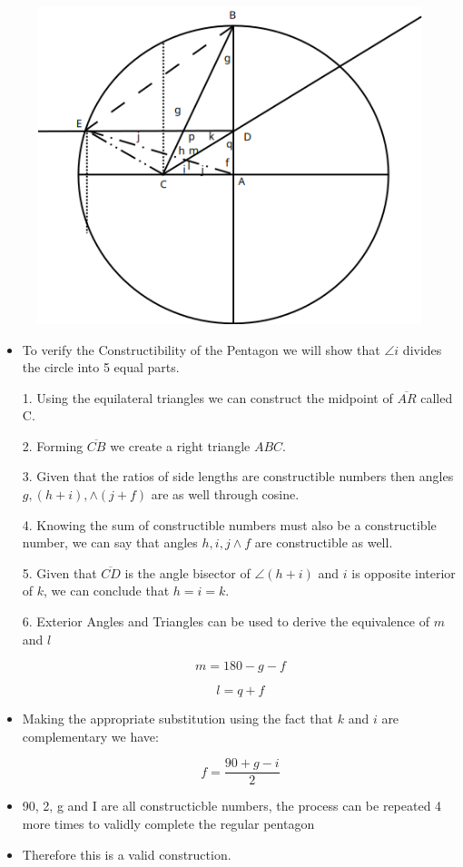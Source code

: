 \documentclass[]{report}
\begin{document}
\begin{figure}[H]
	\centering
	\includegraphics[width=0.7\linewidth]{pics/p3}
\end{figure}

\begin{itemize}
\item To verify the Constructibility of the Pentagon we will show that $\angle{i}$  divides the circle into 5 equal parts.

\item[1.]  Using the equilateral triangles we can construct the midpoint of $\overline{AR}$  called C.

\item[2.]  Forming $\overline{CB}$ we create a right triangle $ABC$.  

\item[3.] Given that the ratios of side lengths are constructible numbers then  angles $g, (h + i),  \land  (j + f)$ are as well through cosine.

\item[4.] Knowing the sum of constructible numbers must also be a constructible number, we can say that angles $ h, i, j \land f$ are constructible as well.

\item[5.] Given that $\overline{CD}$ is the angle bisector of $\angle (h + i)$ and $i$ is opposite interior of $k$,  we can conclude that $h = i = k$.

\item[6.] Exterior Angles and Triangles can be used to derive the equivalence of $m$ and $l$ 

$$ m = 180 - g - f $$

$$ l = q + f $$ 

\item Making the appropriate substitution using the fact that $k$ and $i$ are complementary we have:

$$ f = \frac{90 + g - i}{2}  $$


\item 90, 2, g and I are all constructicble numbers, the process can be repeated 4 more times to validly complete the regular pentagon


\item Therefore this is a valid construction.



\end{itemize}


\begin{flushright}
\smiley{}
\end{flushright}
\end{document}
